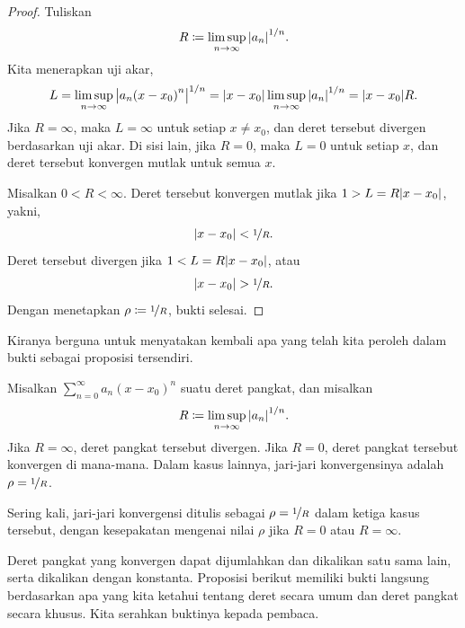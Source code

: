 \begin{proof}
Tuliskan
\begin{equation*}
R \coloneqq \limsup_{n\to\infty} {\lvert {a_n} \rvert}^{1/n} .
\end{equation*}
Kita menerapkan uji akar,
\begin{equation*}
L = \limsup_{n\to\infty} {\bigl\lvert {a_n {(x-x_0)}^n} \bigr\rvert}^{1/n} 
=
\lvert {x-x_0} \rvert \limsup_{n\to\infty} {\lvert {a_n} \rvert}^{1/n}
=
\lvert {x-x_0} \rvert R .
\end{equation*}
Jika $R = \infty$, maka $L=\infty$ untuk setiap $x \neq x_0$, dan
deret tersebut divergen berdasarkan uji akar.
Di sisi lain,
jika $R = 0$, maka $L=0$ untuk setiap $x$,
dan deret tersebut konvergen mutlak untuk semua $x$.

Misalkan $0 < R < \infty$.
Deret tersebut
konvergen mutlak jika
$1 > L = R \lvert {x-x_0} \rvert$,
yakni,
\begin{equation*}
\lvert {x-x_0} \rvert < \nicefrac{1}{R} .
\end{equation*}
Deret tersebut divergen jika
$1 < L = R \lvert {x-x_0} \rvert$,
atau
\begin{equation*}
\lvert {x-x_0} \rvert > \nicefrac{1}{R} .
\end{equation*}
Dengan menetapkan $\rho \coloneqq \nicefrac{1}{R}$, bukti selesai.
\end{proof}

Kiranya berguna untuk menyatakan kembali apa yang telah kita peroleh dalam bukti
sebagai proposisi tersendiri.

\begin{prop}
Misalkan $\sum_{n=0}^\infty a_n {(x-x_0)}^n$ suatu deret pangkat, dan misalkan
\begin{equation*}
R \coloneqq \limsup_{n\to\infty} {\lvert {a_n} \rvert}^{1/n} .
\end{equation*}
Jika $R = \infty$, deret pangkat tersebut divergen.  Jika
$R=0$, deret pangkat tersebut konvergen di mana-mana.   Dalam kasus lainnya,
jari-jari konvergensinya adalah $\rho = \nicefrac{1}{R}$.
\end{prop}

Sering kali, jari-jari konvergensi ditulis sebagai $\rho = \nicefrac{1}{R}$ dalam
ketiga kasus tersebut, dengan
kesepakatan mengenai nilai $\rho$ jika $R = 0$ atau $R =
\infty$.

\pagebreak[2]
Deret pangkat yang konvergen dapat dijumlahkan dan dikalikan satu sama lain, serta dikalikan
dengan konstanta.
Proposisi berikut memiliki bukti langsung berdasarkan apa yang kita ketahui tentang deret
secara umum dan deret pangkat secara khusus.  Kita serahkan buktinya kepada pembaca.

